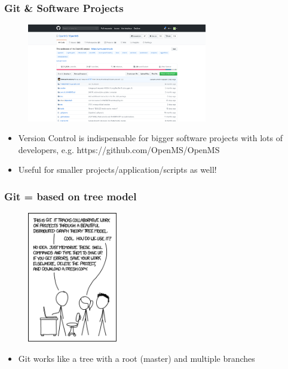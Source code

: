\documentclass{beamer} %
\begin{document}
\begin{frame}[t]
\frametitle{Git \& Software Projects}
\begin{figure}
    \begin{center}
    	\includegraphics[width=0.7\textwidth]{assets/OpenMS.png}
    \end{center}
\end{figure} 
\begin{itemize}
    \setlength\itemsep{1em}
	\item Version Control is indispensable for bigger software projects with lots of developers, 
	e.g. https://github.com/OpenMS/OpenMS
    \item Useful for smaller projects/application/scripts as well! \newline
\end{itemize}
\end{frame}


\begin{frame}[t]
	\frametitle{Git = based on tree model}
	\begin{figure}
		\begin{center}
			\includegraphics[width=0.35\textwidth]{assets/git-f2.png}
		\end{center}
	\end{figure} 
	\begin{itemize}
		\setlength\itemsep{1em}
		\item Git works like a tree with a root (master) and multiple branches
	\end{itemize}
\end{frame}
\end{document}
